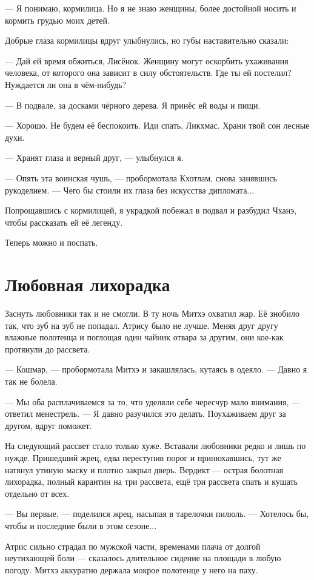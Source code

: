 --- Я понимаю, кормилица.
Но я не знаю женщины, более достойной носить и кормить грудью моих детей.

Добрые глаза кормилицы вдруг улыбнулись, но губы наставительно сказали:

--- Дай ей время обжиться, Лисёнок.
Женщину могут оскорбить ухаживания человека, от которого она зависит в силу обстоятельств.
Где ты ей постелил?
Нуждается ли она в чём-нибудь?

--- В подвале, за досками чёрного дерева.
Я принёс ей воды и пищи.

--- Хорошо.
Не будем её беспокоить.
Иди спать, Ликхмас.
Храни твой сон лесные духи.

--- Хранят глаза и верный друг, --- улыбнулся я.

--- Опять эта воинская чушь, --- пробормотала Кхотлам, снова занявшись рукоделием.
--- Чего бы стоили их глаза без искусства дипломата...

Попрощавшись с кормилицей, я украдкой побежал в подвал и разбудил Чханэ, чтобы рассказать ей её легенду.

Теперь можно и поспать.

\section{Любовная лихорадка}

Заснуть любовники так и не смогли.
В ту ночь Митхэ охватил жар.
Её знобило так, что зуб на зуб не попадал.
Атрису было не лучше.
Меняя друг другу влажные полотенца и поглощая один чайник отвара за другим, они кое-как протянули до рассвета.

--- Кошмар, --- пробормотала Митхэ и закашлялась, кутаясь в одеяло.
--- Давно я так не болела.

--- Мы оба расплачиваемся за то, что уделяли себе чересчур мало внимания, --- ответил менестрель.
--- Я давно разучился это делать.
Поухаживаем друг за другом, вдруг поможет.

На следующий рассвет стало только хуже.
Вставали любовники редко и лишь по нужде.
Пришедший жрец, едва переступив порог и принюхавшись, тут же натянул утиную маску и плотно закрыл дверь.
Вердикт --- острая болотная лихорадка, полный карантин на три рассвета, ещё три рассвета спать и кушать отдельно от всех.

--- Вы первые, --- поделился жрец, насыпая в тарелочки пилюль.
--- Хотелось бы, чтобы и последние были в этом сезоне...

Атрис сильно страдал по мужской части, временами плача от долгой неутихающей боли --- сказалось длительное сидение на площади в любую погоду.
Митхэ аккуратно держала мокрое полотенце у него на паху.

